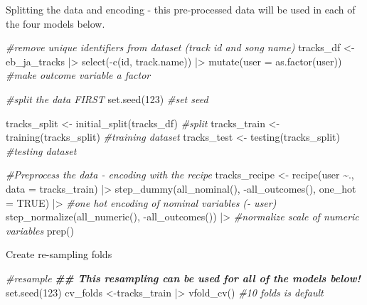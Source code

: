 \documentclass[
]{article}
\newenvironment{Shaded}{\begin{snugshade}}{\end{snugshade}}
\newcommand{\AttributeTok}[1]{\textcolor[rgb]{0.77,0.63,0.00}{#1}}
\newcommand{\CommentTok}[1]{\textcolor[rgb]{0.56,0.35,0.01}{\textit{#1}}}
\newcommand{\ConstantTok}[1]{\textcolor[rgb]{0.00,0.00,0.00}{#1}}
\newcommand{\DecValTok}[1]{\textcolor[rgb]{0.00,0.00,0.81}{#1}}
\newcommand{\DocumentationTok}[1]{\textcolor[rgb]{0.56,0.35,0.01}{\textbf{\textit{#1}}}}
\newcommand{\FunctionTok}[1]{\textcolor[rgb]{0.00,0.00,0.00}{#1}}
\newcommand{\NormalTok}[1]{#1}
\newcommand{\OtherTok}[1]{\textcolor[rgb]{0.56,0.35,0.01}{#1}}
\newcommand{\SpecialCharTok}[1]{\textcolor[rgb]{0.00,0.00,0.00}{#1}}
\begin{document}
Splitting the data and encoding - this pre-processed data will be used
in each of the four models below.

\begin{Shaded}
\begin{Highlighting}[]
\CommentTok{\#remove unique identifiers from dataset (track id and song name)}
\NormalTok{tracks\_df }\OtherTok{\textless{}{-}}\NormalTok{ eb\_ja\_tracks }\SpecialCharTok{|\textgreater{}} 
  \FunctionTok{select}\NormalTok{(}\SpecialCharTok{{-}}\FunctionTok{c}\NormalTok{(id, track.name)) }\SpecialCharTok{|\textgreater{}} 
  \FunctionTok{mutate}\NormalTok{(}\AttributeTok{user =} \FunctionTok{as.factor}\NormalTok{(user)) }\CommentTok{\#make outcome variable a factor}

\CommentTok{\#split the data FIRST}
\FunctionTok{set.seed}\NormalTok{(}\DecValTok{123}\NormalTok{) }\CommentTok{\#set seed}

\NormalTok{tracks\_split }\OtherTok{\textless{}{-}} \FunctionTok{initial\_split}\NormalTok{(tracks\_df) }\CommentTok{\#split}
\NormalTok{tracks\_train }\OtherTok{\textless{}{-}} \FunctionTok{training}\NormalTok{(tracks\_split) }\CommentTok{\#training dataset}
\NormalTok{tracks\_test }\OtherTok{\textless{}{-}} \FunctionTok{testing}\NormalTok{(tracks\_split) }\CommentTok{\#testing dataset}

\CommentTok{\#Preprocess the data {-} encoding with the recipe}
\NormalTok{tracks\_recipe }\OtherTok{\textless{}{-}} \FunctionTok{recipe}\NormalTok{(user }\SpecialCharTok{\textasciitilde{}}\NormalTok{., }\AttributeTok{data =}\NormalTok{ tracks\_train) }\SpecialCharTok{|\textgreater{}} 
  \FunctionTok{step\_dummy}\NormalTok{(}\FunctionTok{all\_nominal}\NormalTok{(), }\SpecialCharTok{{-}}\FunctionTok{all\_outcomes}\NormalTok{(), }\AttributeTok{one\_hot =} \ConstantTok{TRUE}\NormalTok{) }\SpecialCharTok{|\textgreater{}} \CommentTok{\#one hot encoding of nominal variables ({-} user)}
  \FunctionTok{step\_normalize}\NormalTok{(}\FunctionTok{all\_numeric}\NormalTok{(), }\SpecialCharTok{{-}}\FunctionTok{all\_outcomes}\NormalTok{()) }\SpecialCharTok{|\textgreater{}} \CommentTok{\#normalize scale of numeric variables }
  \FunctionTok{prep}\NormalTok{()}
\end{Highlighting}
\end{Shaded}

Create re-sampling folds

\begin{Shaded}
\begin{Highlighting}[]
\CommentTok{\#resample}
\DocumentationTok{\#\# This resampling can be used for all of the models below!}
\FunctionTok{set.seed}\NormalTok{(}\DecValTok{123}\NormalTok{)}
\NormalTok{cv\_folds }\OtherTok{\textless{}{-}}\NormalTok{tracks\_train }\SpecialCharTok{|\textgreater{}} 
  \FunctionTok{vfold\_cv}\NormalTok{() }\CommentTok{\#10 folds is default}
\end{Highlighting}
\end{Shaded}
\end{document}
